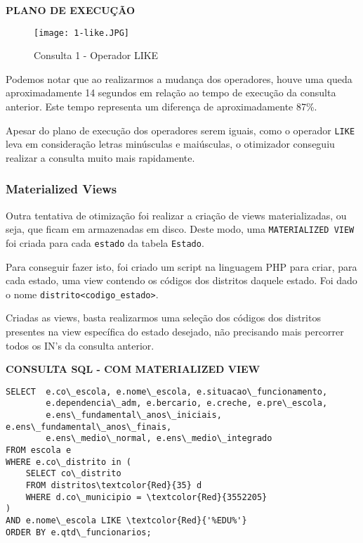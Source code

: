 \documentclass[12pt,a4paper]{article}
\begin{document}
\begin{flushleft}
\textbf{PLANO DE EXECUÇÃO}\\
\end{flushleft}

\begin{figure}[H]
    \centering
    \texttt{[image: 1-like.JPG]}
    \caption{Consulta 1 - Operador LIKE}
    \label{fig:diagrama}
\end{figure}

Podemos notar que ao realizarmos a mudança dos operadores, houve uma queda aproximadamente 14 segundos em relação ao tempo de execução da consulta anterior. Este tempo representa um diferença de aproximadamente 87\%.   

Apesar do plano de execução dos operadores serem iguais, como o operador \texttt{LIKE} leva em consideração letras minúsculas e maiúsculas, o otimizador conseguiu realizar a consulta muito mais rapidamente.


\subsubsection{Materialized Views}

Outra tentativa de otimização foi realizar a criação de views materializadas, ou seja, que ficam em armazenadas em disco. Deste modo, uma \texttt{MATERIALIZED VIEW} foi criada para cada \texttt{estado} da tabela \texttt{Estado}. 

Para conseguir fazer isto, foi criado um script na linguagem PHP para criar, para cada estado, uma view contendo os códigos dos distritos daquele estado. Foi dado o nome \texttt{distrito<codigo\_estado>}.

Criadas as views, basta realizarmos uma seleção dos códigos dos distritos presentes na view específica do estado desejado, não precisando mais percorrer todos os IN's da consulta anterior.

\vspace{0.5cm}
\begin{flushleft}
\textbf{CONSULTA SQL - COM MATERIALIZED VIEW}\\
\end{flushleft}

\begin{Verbatim}[commandchars=\\\{\}]
SELECT  e.co\_escola, e.nome\_escola, e.situacao\_funcionamento, 
        e.dependencia\_adm, e.bercario, e.creche, e.pre\_escola,
        e.ens\_fundamental\_anos\_iniciais, e.ens\_fundamental\_anos\_finais,
        e.ens\_medio\_normal, e.ens\_medio\_integrado
FROM escola e
WHERE e.co\_distrito in (
    SELECT co\_distrito
    FROM distritos\textcolor{Red}{35} d
    WHERE d.co\_municipio = \textcolor{Red}{3552205}
)
AND e.nome\_escola LIKE \textcolor{Red}{'%EDU%'}
ORDER BY e.qtd\_funcionarios;
\end{Verbatim}
\end{document}
